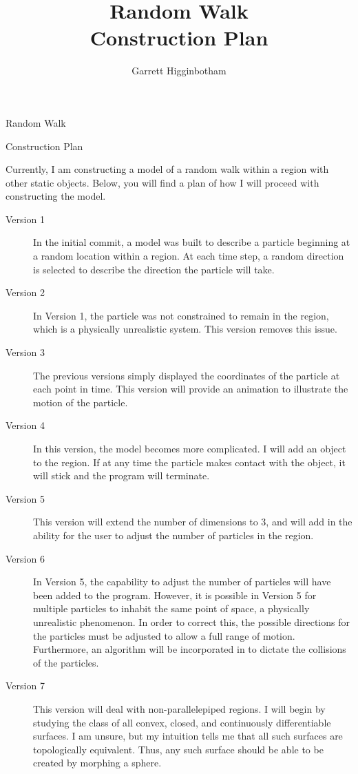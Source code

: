 \documentclass{article}[12pt]
\title{Random Walk\\Construction Plan}
\author{Garrett Higginbotham}
\begin{document}
\centerline{\Large{Random Walk}}
\centerline{\Large{Construction Plan}}

\vskip 0.5in

Currently, I am constructing a model of a random walk within a region with other static objects. Below, you will find a plan of how I will proceed with constructing the model.

\begin{description}
	\item[Version 1] In the initial commit, a model was built to describe a particle beginning at a random location within a region. At each time step, a random direction is selected to describe the direction the particle will take.
	\item[Version 2] In Version 1, the particle was not constrained to remain in the region, which is a physically unrealistic system. This version removes this issue.
	\item[Version 3] The previous versions simply displayed the coordinates of the particle at each point in time. This version will provide an animation to illustrate the motion of the particle.
	\item[Version 4] In this version, the model becomes more complicated. I will add an object to the region. If at any time the particle makes contact with the object, it will stick and the program will terminate.
	\item[Version 5] This version will extend the number of dimensions to 3, and will add in the ability for the user to adjust the number of particles in the region.
	\item[Version 6] In Version 5, the capability to adjust the number of particles will have been added to the program. However, it is possible in Version 5 for multiple particles to inhabit the same point of space, a physically unrealistic phenomenon. In order to correct this, the possible directions for the particles must be adjusted to allow a full range of motion. Furthermore, an algorithm will be incorporated in to dictate the collisions of the particles.
	\item[Version 7] This version will deal with non-parallelepiped regions. I will begin by studying the class of all convex, closed, and continuously differentiable surfaces. I am unsure, but my intuition tells me that all such surfaces are topologically equivalent. Thus, any such surface should be able to be created by morphing a sphere.
\end{description}
\end{document}

